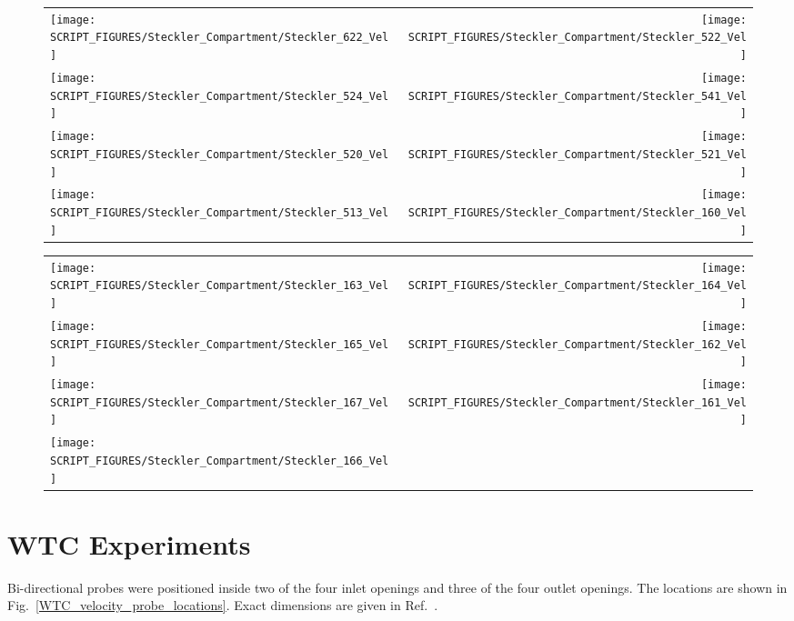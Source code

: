 \begin{figure}[p]
\begin{tabular*}{\textwidth}{l@{\extracolsep{\fill}}r}
\texttt{[image: SCRIPT\_FIGURES/Steckler\_Compartment/Steckler\_622\_Vel]} &
\texttt{[image: SCRIPT\_FIGURES/Steckler\_Compartment/Steckler\_522\_Vel]} \\
\texttt{[image: SCRIPT\_FIGURES/Steckler\_Compartment/Steckler\_524\_Vel]} &
\texttt{[image: SCRIPT\_FIGURES/Steckler\_Compartment/Steckler\_541\_Vel]} \\
\texttt{[image: SCRIPT\_FIGURES/Steckler\_Compartment/Steckler\_520\_Vel]} &
\texttt{[image: SCRIPT\_FIGURES/Steckler\_Compartment/Steckler\_521\_Vel]} \\
\texttt{[image: SCRIPT\_FIGURES/Steckler\_Compartment/Steckler\_513\_Vel]} &
\texttt{[image: SCRIPT\_FIGURES/Steckler\_Compartment/Steckler\_160\_Vel]}
\end{tabular*}
\label{Steckler_Vel_6}
\end{figure}

\begin{figure}[p]
\begin{tabular*}{\textwidth}{l@{\extracolsep{\fill}}r}
\texttt{[image: SCRIPT\_FIGURES/Steckler\_Compartment/Steckler\_163\_Vel]} &
\texttt{[image: SCRIPT\_FIGURES/Steckler\_Compartment/Steckler\_164\_Vel]} \\
\texttt{[image: SCRIPT\_FIGURES/Steckler\_Compartment/Steckler\_165\_Vel]} &
\texttt{[image: SCRIPT\_FIGURES/Steckler\_Compartment/Steckler\_162\_Vel]} \\
\texttt{[image: SCRIPT\_FIGURES/Steckler\_Compartment/Steckler\_167\_Vel]} &
\texttt{[image: SCRIPT\_FIGURES/Steckler\_Compartment/Steckler\_161\_Vel]} \\
\texttt{[image: SCRIPT\_FIGURES/Steckler\_Compartment/Steckler\_166\_Vel]} &

\end{tabular*}
\label{Steckler_Vel_7}
\end{figure}



\clearpage


\section{WTC Experiments}

Bi-directional probes were positioned inside two of the four inlet openings and three of the four outlet openings. The locations are shown in Fig.~\ref{WTC_velocity_probe_locations}. Exact dimensions are given in Ref.~\cite{NIST_NCSTAR_1-5B}.

